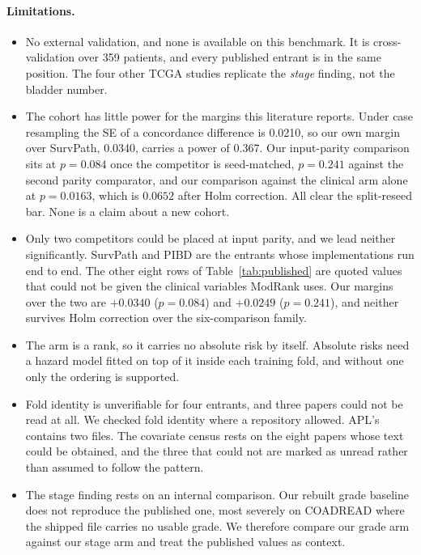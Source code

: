 \documentclass[unnumsec,webpdf,contemporary,large]{oup-authoring-template}
\begin{document}
\paragraph{Limitations.}
\begin{itemize}
  \item No external validation, and none is available on this benchmark. It is
    cross-validation over 359 patients, and every published entrant is in the same position. The
    four other TCGA studies replicate the \emph{stage} finding, not the bladder number.
  \item The cohort has little power for the margins this literature reports. Under case
    resampling the SE of a concordance difference is 0.0210, so our own margin over SurvPath,
    0.0340, carries a power of 0.367. Our input-parity comparison sits at
    $p=0.084$ once the competitor is seed-matched, $p=0.241$ against the second parity
    comparator, and our comparison against the clinical arm alone at $p=0.0163$, which is
    $0.0652$ after Holm correction. All clear the split-reseed bar. None is a claim about a new
    cohort.
  \item Only two competitors could be placed at input parity, and we lead neither
    significantly. SurvPath and PIBD are the entrants whose implementations run end to end. The
    other eight rows of Table~\ref{tab:published} are quoted values that could not be given the clinical variables ModRank uses. Our margins over the two are $+0.0340$ ($p=0.084$) and
    $+0.0249$ ($p=0.241$), and neither survives Holm correction over the six-comparison family.
  \item The arm is a rank, so it carries no absolute risk by itself. Absolute risks need a hazard
    model fitted on top of it inside each training fold, and without one only the ordering is
    supported.
  \item Fold identity is unverifiable for four entrants, and three papers could not be read
    at all. We checked fold identity where a repository allowed. APL's contains two files. The
    covariate census rests on the eight papers whose text could be obtained, and the three that could not are marked as unread rather than assumed to follow the pattern.
  \item The stage finding rests on an internal comparison. Our rebuilt grade baseline does
    not reproduce the published one, most severely on COADREAD where the shipped file carries no
    usable grade. We therefore compare our grade arm against our stage arm and treat the published
    values as context.

\end{itemize}
\end{document}
